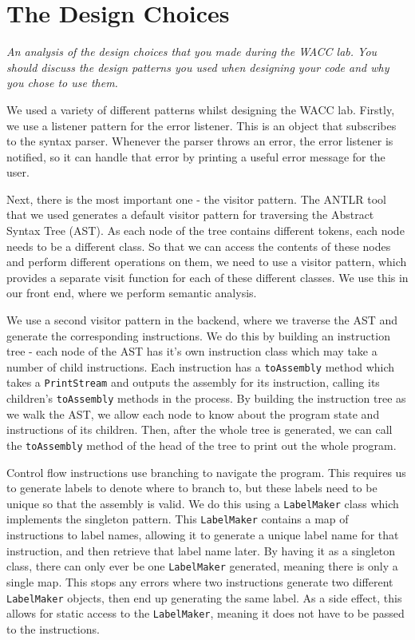 \documentclass[]{article}
\newcommand{\spec}[1]{\textit{#1}\par\noindent}
\begin{document}
\section{The Design Choices}
\spec{An analysis of the design choices that you made during the WACC lab. You should discuss the design patterns you used when designing your code and why you chose to use them.}
We used a variety of different patterns whilst designing the WACC lab. Firstly, we use a listener pattern for the error listener. This is an object that subscribes to the syntax parser. Whenever the parser throws an error, the error listener is notified, so it can handle that error by printing a useful error message for the user.

Next, there is the most important one - the visitor pattern. The ANTLR tool that we used generates a default visitor pattern for traversing the Abstract Syntax Tree (AST). As each node of the tree contains different tokens, each node needs to be a different class. So that we can access the contents of these nodes and perform different operations on them, we need to use a visitor pattern, which provides a separate visit function for each of these different classes. We use this in our front end, where we perform semantic analysis.

We use a second visitor pattern in the backend, where we traverse the AST and generate the corresponding instructions. We do this by building an instruction tree - each node of the AST has it's own instruction class which may take a number of child instructions. Each instruction has a {\tt toAssembly} method which takes a {\tt PrintStream} and outputs the assembly for its instruction, calling its children's {\tt toAssembly} methods in the process. By building the instruction tree as we walk the AST, we allow each node to know about the program state and instructions of its children. Then, after the whole tree is generated, we can call the {\tt toAssembly} method of the head of the tree to print out the whole program.

Control flow instructions use branching to navigate the program. This requires us to generate labels to denote where to branch to, but these labels need to be unique so that the assembly is valid. We do this using a {\tt LabelMaker} class which implements the singleton pattern. This {\tt LabelMaker} contains a map of instructions to label names, allowing it to generate a unique label name for that instruction, and then retrieve that label name later. By having it as a singleton class, there can only ever be one {\tt LabelMaker} generated, meaning there is only a single map. This stops any errors where two instructions generate two different {\tt LabelMaker} objects, then end up generating the same label. As a side effect, this allows for static access to the {\tt LabelMaker}, meaning it does not have to be passed to the instructions.
\end{document}
